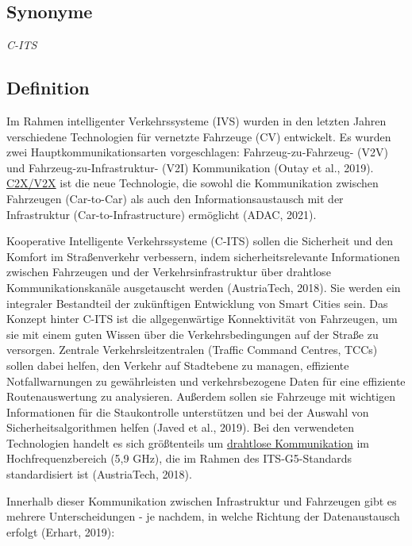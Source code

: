 \documentclass[
]{book}
\begin{document}
\hypertarget{synonyme-11}{%
\subsection*{Synonyme}\label{synonyme-11}}

\emph{C-ITS}

\hypertarget{definition-12}{%
\subsection*{Definition}\label{definition-12}}

Im Rahmen intelligenter Verkehrssysteme (IVS) wurden in den letzten Jahren verschiedene Technologien für vernetzte Fahrzeuge (CV) entwickelt. Es wurden zwei Hauptkommunikationsarten vorgeschlagen: Fahrzeug-zu-Fahrzeug- (V2V) und Fahrzeug-zu-Infrastruktur- (V2I) Kommunikation (Outay et al., 2019).
\protect\hyperlink{v2x}{C2X/V2X} ist die neue Technologie, die sowohl die Kommunikation zwischen Fahrzeugen (Car-to-Car) als auch den Informationsaustausch mit der Infrastruktur (Car-to-Infrastructure) ermöglicht (ADAC, 2021).

Kooperative Intelligente Verkehrssysteme (C-ITS) sollen die Sicherheit und den Komfort im Straßenverkehr verbessern, indem sicherheitsrelevante Informationen zwischen Fahrzeugen und der Verkehrsinfrastruktur über drahtlose Kommunikationskanäle ausgetauscht werden (AustriaTech, 2018). Sie werden ein integraler Bestandteil der zukünftigen Entwicklung von Smart Cities sein. Das Konzept hinter C-ITS ist die allgegenwärtige Konnektivität von Fahrzeugen, um sie mit einem guten Wissen über die Verkehrsbedingungen auf der Straße zu versorgen. Zentrale Verkehrsleitzentralen (Traffic Command Centres, TCCs) sollen dabei helfen, den Verkehr auf Stadtebene zu managen, effiziente Notfallwarnungen zu gewährleisten und verkehrsbezogene Daten für eine effiziente Routenauswertung zu analysieren. Außerdem sollen sie Fahrzeuge mit wichtigen Informationen für die Staukontrolle unterstützen und bei der Auswahl von Sicherheitsalgorithmen helfen (Javed et al., 2019). Bei den verwendeten Technologien handelt es sich größtenteils um \protect\hyperlink{wireless_com}{drahtlose Kommunikation} im Hochfrequenzbereich (5,9 GHz), die im Rahmen des ITS-G5-Standards standardisiert ist (AustriaTech, 2018).

Innerhalb dieser Kommunikation zwischen Infrastruktur und Fahrzeugen gibt es mehrere Unterscheidungen - je nachdem, in welche Richtung der Datenaustausch erfolgt (Erhart, 2019):
\end{document}
